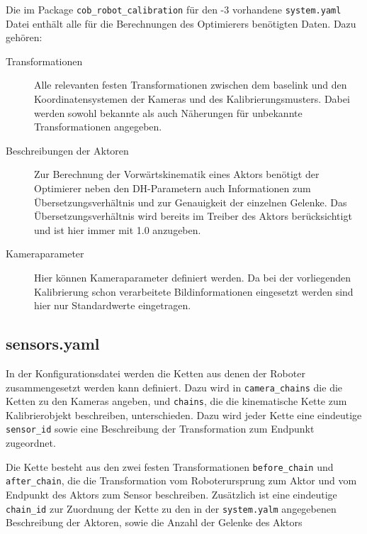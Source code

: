Die im Package \texttt{cob\_robot\_calibration}
    für den -3 vorhandene \texttt{system.yaml} Datei enthält alle für die
    Berechnungen des Optimierers benötigten Daten. Dazu gehören:

    \begin{description}

      \item[Transformationen] Alle relevanten festen Transformationen zwischen
        dem \ac{baselink} und den Koordinatensystemen der Kameras und des
        Kalibrierungsmusters. Dabei werden sowohl bekannte als auch Näherungen
	für unbekannte Transformationen angegeben.

      \item[Beschreibungen der Aktoren] Zur Berechnung der
        Vorwärtskinematik eines Aktors benötigt der Optimierer neben den
        \acl{DH-Parameter}n auch Informationen zum Übersetzungsverhältnis und
        zur Genauigkeit der einzelnen Gelenke. Das Übersetzungsverhältnis wird
        bereits im Treiber des Aktors berücksichtigt und ist hier immer mit 1.0
        anzugeben.

      \item[Kameraparameter] Hier können Kameraparameter definiert werden. Da
        bei der vorliegenden Kalibrierung schon verarbeitete
        Bildinformationen eingesetzt werden sind hier nur Standardwerte
        eingetragen.

    \end{description}

  \subsection{sensors.yaml} In der Konfigurationsdatei werden die Ketten aus
    denen der Roboter zusammengesetzt werden kann definiert. Dazu wird in
    \texttt{camera\_chains} die die Ketten zu den Kameras angeben, und 
    \texttt{chains}, die die kinematische Kette zum Kalibrierobjekt beschreiben,
    unterschieden.
    Dazu wird jeder Kette eine eindeutige \texttt{sensor\_id} sowie eine
    Beschreibung der Transformation zum Endpunkt zugeordnet.
    
    Die Kette besteht aus den zwei festen Transformationen \texttt{before\_chain}
    und \texttt{after\_chain}, die die Transformation vom Roboterursprung zum 
    Aktor und vom Endpunkt des Aktors zum Sensor beschreiben. Zusätzlich ist 
    eine eindeutige \texttt{chain\_id} zur Zuordnung der Kette zu den in der 
    \texttt{system.yalm} angegebenen Beschreibung der Aktoren, sowie die Anzahl
    der Gelenke des Aktors

